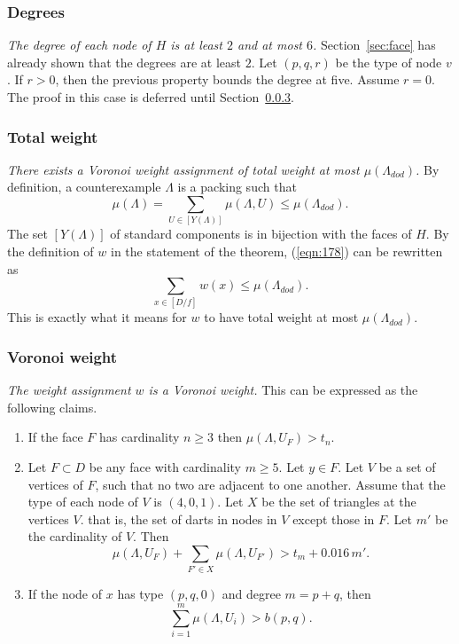 \documentclass{article} %
\begin{document}
\subsubsection{Degrees}\label{sec:degrees}

{\it The degree of each node of $H$ is at least $2$ and at most $6$.}
Section~\ref{sec:face} has already shown that the degrees are at least $2$.
Let $(p,q,r)$ be the type of node $v$.  If $r>0$, then the previous
property bounds the degree at five.  Assume $r=0$.  The
proof in this case is deferred until Section~\ref{sec:pq}.




\subsubsection{Total weight}

{\it There exists a Voronoi weight assignment of total weight at most $\mu(\Lambda_{dod})$.}
By definition, a counterexample $\Lambda$ is a packing such that
\begin{equation}\label{eqn:178}
\mu(\Lambda)=\sum_{U\in [Y(\Lambda)]} \mu(\Lambda,U) \le \mu(\Lambda_{dod}).
\end{equation}
The set  $[Y(\Lambda)]$ of standard components is in bijection with the faces of $H$.
By the definition of $w$ in the statement of the theorem, (\ref{eqn:178}) can
be rewritten as
$$
\sum_{x\in[D/f]} w(x) \le \mu(\Lambda_{dod}).
$$
This is exactly what it means for $w$ to have total weight at most $\mu(\Lambda_{dod})$.

\subsubsection{Voronoi weight}\label{sec:pq}

{\it The weight assignment $w$ is a Voronoi weight.}
This can be expressed as the following claims.
\begin{enumerate}
\item If the face $F$  has cardinality $n\ge3$ then $\mu(\Lambda,U_F)> t_n$.
\item Let $F\subset D$ 
be any face with cardinality $m \ge 5$.  Let $y\in F$.
Let $V$ be a set of vertices of $F$, such
that no two are adjacent to one another.  
Assume that the type of each node of $V$ is $(4,0,1)$.
Let $X$ be the set of triangles at the vertices $V$.
that is, the set of darts in nodes in $V$ except those in $F$.
Let $m'$ be the cardinality of $V$.
Then
\begin{equation}\label{eqn:m'}
\mu(\Lambda,U_F) + \sum_{F'\in X} \mu(\Lambda,U_{F'}) > t_m  +  0.016\, m'.
\end{equation}
\item If the node of $x$ has type $(p,q,0)$ and degree $m=p+q$, then
  \begin{equation}\label{eqn:pq}
  \sum_{i=1}^m \mu(\Lambda,U_i) > b(p,q).
  \end{equation}
\end{enumerate}
\end{document}
